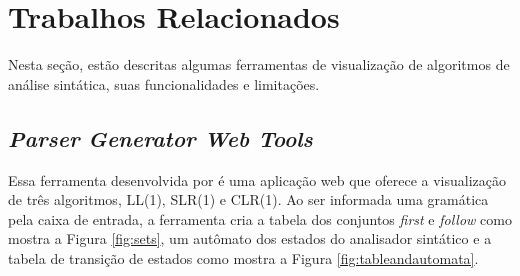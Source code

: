 \chapter{Trabalhos Relacionados}
\label{cap:trabalhos-relacionados}

Nesta seção, estão descritas algumas ferramentas de visualização de algoritmos de análise sintática, suas funcionalidades e limitações.

\section{\textit{Parser Generator Web Tools}}
\label{sec:trabalho-relacionado-a}

Essa ferramenta desenvolvida por \textcite{Parser-2024-04-12} é uma aplicação web que oferece a visualização de três algoritmos, LL(1), SLR(1) e CLR(1). Ao ser informada uma gramática pela caixa de entrada, a ferramenta cria a tabela dos conjuntos \textit{first} e \textit{follow} como mostra a Figura \ref{fig:sets}, um autômato dos estados do analisador sintático e a tabela de transição de estados como mostra a Figura \ref{fig:tableandautomata}.
\begin{figure}[htp]
    \captionsetup{width=16cm}
\end{figure}
